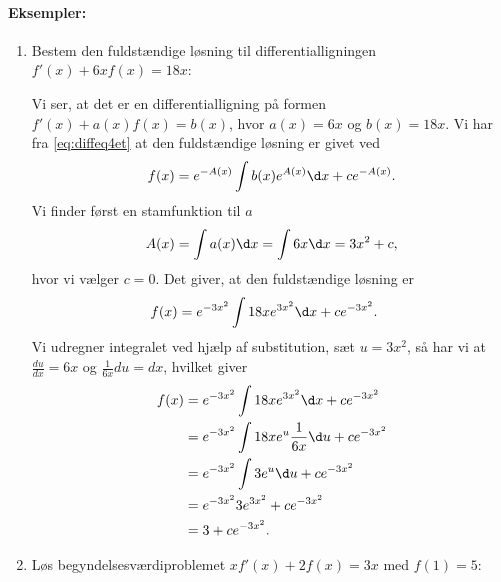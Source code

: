 \paragraph*{Eksempler:}
\begin{enumerate}
\item Bestem den fuldstændige løsning til differentialligningen $f'(x) + 6xf(x) = 18x$:

Vi ser, at det er en differentialligning på formen $f'(x)+a(x)f(x)=b(x)$, hvor $a(x)=6x$ og $b(x)=18x$. Vi har fra \eqref{eq:diffeq4et} at den fuldstændige løsning er givet ved
\begin{align*}
f(x)=e^{-A(x)} \int b(x) e^{A(x)} \d x + ce^{-A(x)}.
\end{align*}
Vi finder først en stamfunktion til $a$
\begin{align*}
A(x) = \int a(x) \d x = \int 6x \d x = 3x^2 + c,
\end{align*}
hvor vi vælger $c=0$. Det giver, at den fuldstændige løsning er
\begin{align*}
f(x)&=e^{-3x^2} \int 18xe^{3x^2} \d x + ce^{-3x^2}.
\end{align*}
Vi udregner integralet ved hjælp af substitution, sæt $u=3x^2$, så har vi at $ \frac{du}{dx} = 6x$ og $\frac{1}{6x}du = dx$, hvilket giver
\begin{align*}
f(x)&=e^{-3x^2} \int 18xe^{3x^2} \d x + ce^{-3x^2} \\
&=e^{-3x^2} \int 18xe^{u} \frac{1}{6x}\d u + ce^{-3x^2} \\
&=e^{-3x^2} \int 3e^{u} \d u + ce^{-3x^2} \\
&=e^{-3x^2}  3e^{3x^2} + ce^{-3x^2} \\
&=3+ce^{-3x^2}.
\end{align*}
\item Løs begyndelsesværdiproblemet $x f'(x) + 2f(x) = 3x$ med $f(1)=5$:


\end{enumerate}
